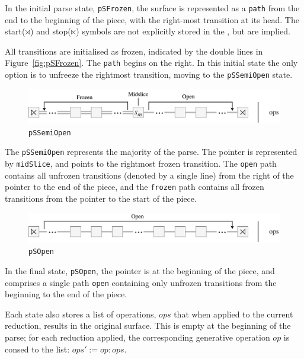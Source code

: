 \documentclass[12pt,a4paper,twoside,openright]{report}
\theoremstyle{definition}
\begin{document}
In the initial parse state, \texttt{pSFrozen}, the surface is represented as a \texttt{path} from the end to the beginning of the piece, with the right-most transition at its head. The start($\rtimes$) and stop($\ltimes$) symbols are not explicitly stored in the , but are implied.

All transitions are initialised as frozen, indicated by the double lines in Figure~\ref{fig:pSFrozen}. The \texttt{path} begins on the right. In this initial state the only option is to unfreeze the rightmost transition, moving to the \texttt{pSSemiOpen} state. 

\begin{figure}[h]
  \centering\includegraphics[width=\textwidth]{impl/parseState/semiopen.png}
  \caption{\texttt{pSSemiOpen}}
  \label{fig:pSSemiOpen}
\end{figure}

The \texttt{pSSemiOpen} represents the majority of the parse. The pointer is represented by \texttt{midSlice}, and points to the rightmost frozen transition. The \texttt{open} path contains all unfrozen transitions (denoted by a single line) from the right of the pointer to the end of the piece, and the \texttt{frozen} path contains all frozen transitions from the pointer to the start of the piece.

\begin{figure}[h]
  \centering\includegraphics[width=\textwidth]{impl/parseState/open.png}
  \caption{\texttt{pSOpen}}
  \label{fig:pSOpen}
\end{figure}

In the final state, \texttt{pSOpen}, the pointer is at the beginning of the piece, and comprises a single path \texttt{open} containing only unfrozen transitions from the beginning to the end of the piece.

Each state also stores a list of operations, $ops$ that when applied to the current reduction, results in the original surface. This is empty at the beginning of the parse; for each reduction applied, the corresponding generative operation $op$ is consed to the list: $ops' := op:ops$. 
\end{document}
